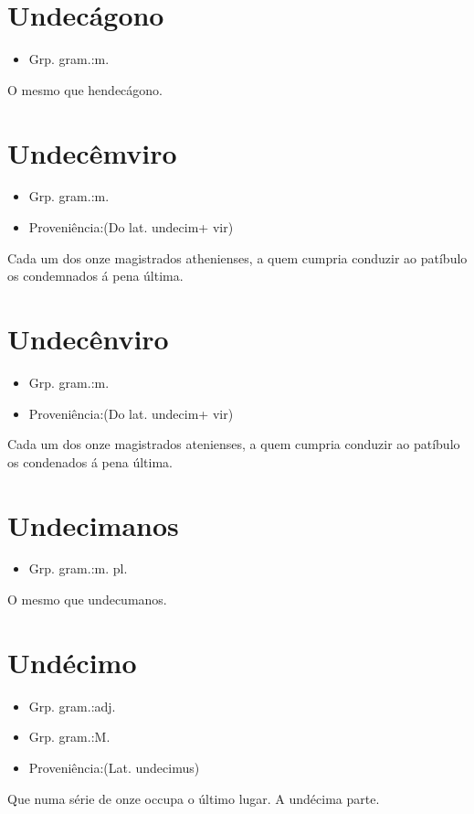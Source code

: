 \documentclass{article}
\begin{document}
\section{Undecágono}
\begin{itemize}
\item {Grp. gram.:m.}
\end{itemize}
O mesmo que \textunderscore hendecágono\textunderscore .
\section{Undecêmviro}
\begin{itemize}
\item {Grp. gram.:m.}
\end{itemize}
\begin{itemize}
\item {Proveniência:(Do lat. \textunderscore undecim\textunderscore  + \textunderscore vir\textunderscore )}
\end{itemize}
Cada um dos onze magistrados athenienses, a quem cumpria conduzir ao patíbulo os condemnados á pena última.
\section{Undecênviro}
\begin{itemize}
\item {Grp. gram.:m.}
\end{itemize}
\begin{itemize}
\item {Proveniência:(Do lat. \textunderscore undecim\textunderscore  + \textunderscore vir\textunderscore )}
\end{itemize}
Cada um dos onze magistrados atenienses, a quem cumpria conduzir ao patíbulo os condenados á pena última.
\section{Undecimanos}
\begin{itemize}
\item {Grp. gram.:m. pl.}
\end{itemize}
O mesmo que \textunderscore undecumanos\textunderscore .
\section{Undécimo}
\begin{itemize}
\item {Grp. gram.:adj.}
\end{itemize}
\begin{itemize}
\item {Grp. gram.:M.}
\end{itemize}
\begin{itemize}
\item {Proveniência:(Lat. \textunderscore undecimus\textunderscore )}
\end{itemize}
Que numa série de onze occupa o último lugar.
A undécima parte.
\end{document}

